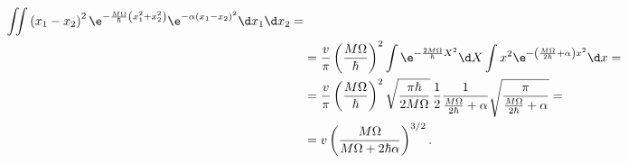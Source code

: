 \begin{solution}
\begin{align}
				\iint\left(x_{1}-x_{2}\right)^{2}\e^{-\frac{M\Omega}{\hbar}\left(x_{1}^{2}+x_{2}^{2}\right)}
				\e^{-\alpha\left(x_{1}-x_{2}\right)^{2}}\d x_{1}\d x_{2}=\nonumber\\
			&=\frac{v}{\pi}\left(\frac{M\Omega}{\hbar}\right)^{2}
				\int\e^{-\frac{2M\Omega}{\hbar}X^{2}}\d X
				\int x^{2}\e^{-\left(\frac{M\Omega}{2\hbar}+\alpha\right)x^{2}}\d x=\nonumber\\
			&=\frac{v}{\pi}\left(\frac{M\Omega}{\hbar}\right)^{2}
				\sqrt{\frac{\pi\hbar}{2M\Omega}}\,
				\frac{1}{2}\frac{1}{\frac{M\Omega}{2\hbar}+\alpha}
				\sqrt{\frac{\pi}{\frac{M\Omega}{2\hbar}+\alpha}}=\nonumber\\
			&=v\left(\frac{M\Omega}{M\Omega+2\hbar\alpha}\right)^{3/2}.
	\end{align}
\end{solution}

